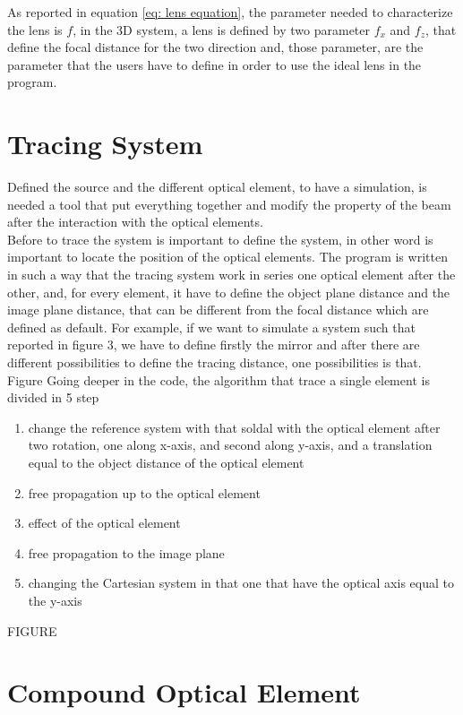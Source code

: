\noindent As reported in equation \ref{eq: lens equation}, the parameter needed to characterize the lens is $f $, in the 3D system, a lens is defined by two parameter $f_x $ and $f_z $, that define the focal distance for the two direction and, those parameter, are the parameter that the users have to define in order to use the ideal lens in the program.

\section{Tracing System}
Defined the source and the different optical element, to have a simulation, is needed a tool that put everything together and modify the property of the beam after the interaction with the optical elements.
\\
Before to trace the system is important to define the system, in other word is important to locate the position of the optical elements. The program is written in such a way that the tracing system work in series one optical element after the other, and, for every element, it have to define the object plane distance and the image plane distance, that can be different from the focal distance which are defined as default. For example, if we want to simulate a system such that reported in figure 3, we have to define firstly the mirror and after there are different possibilities to define the tracing distance, one possibilities is that.
\\Figure
Going deeper in the code, the algorithm that trace a single element is divided in 5 step
\begin{enumerate}
	\item change the reference system with that soldal with the optical element after two rotation, one along x-axis, and second along y-axis, and a translation equal to the object distance of the optical element
	\item free propagation up to the optical element
	\item effect of the optical element
	\item free propagation to the image plane
	\item changing the Cartesian system in that one that have the optical axis equal to the y-axis
\end{enumerate}


FIGURE
\\

\section{Compound Optical Element}

